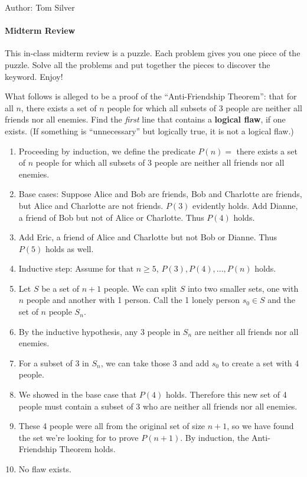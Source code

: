 \documentclass[solution, letterpaper]{cs20inclass}
\begin{document}

\noindent Author: Tom Silver%

\paragraph*{Midterm Review}
This in-class midterm review is a puzzle. Each problem gives you one piece of the puzzle. Solve all the problems and put together the pieces to discover the keyword. Enjoy!

\problem What follows is alleged to be a proof of the ``Anti-Friendship Theorem'': that for all $n$, there exists a set of $n$ people for which all subsets of 3 people are neither all friends nor all enemies. Find the \textit{first} line that contains a \textbf{logical flaw}, if one exists. (If something is ``unnecessary'' but logically true, it is not a logical flaw.)

\begin{enumerate}
\item Proceeding by induction, we define the predicate $P(n) = $ there exists a set of $n$ people for which all subsets of 3 people are neither all friends nor all enemies.
\item Base cases: Suppose Alice and Bob are friends, Bob and Charlotte are friends, but Alice and Charlotte are not friends. $P(3)$ evidently holds. Add Dianne, a friend of Bob but not of Alice or Charlotte. Thus $P(4)$ holds.
\item Add Eric, a friend of Alice and Charlotte but not Bob or Dianne. Thus $P(5)$ holds as well.
\item Inductive step: Assume for that $n \ge 5$, $P(3), P(4), ..., P(n)$ holds.
\item Let $S$ be a set of $n+1$ people. We can split $S$ into two smaller sets, one with $n$ people and another with 1 person. Call the 1 lonely person $s_0 \in S$ and the set of $n$ people $S_n$.
\item By the inductive hypothesis, any 3 people in $S_n$ are neither all friends nor all enemies.
\item For a subset of 3 in $S_n$, we can take those 3 and add $s_0$ to create a set with 4 people.
\item We showed in the base case that $P(4)$ holds. Therefore this new set of 4 people must contain a subset of 3 who are neither all friends nor all enemies.
\item These 4 people were all from the original set of size $n+1$, so we have found the set we're looking for to prove $P(n+1)$. By induction, the Anti-Friendship Theorem holds.
\item No flaw exists.
\end{enumerate}
\end{document}
